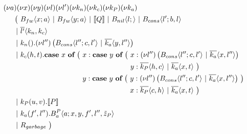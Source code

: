 
\begin{align*}
  &\anew{a}{\anew{x}{\anew{y}{\anew{l}{\anew{l'}{\anew{k_n}{\anew{k_c}{\anew{k_P}{\anew{k_a}{ \\
    &\hspace{0.5cm}
    \begin{aligned}[t]
      \big(\ &\ains{B_{fw}}{x}{a}
      \apar   \ains{B_{fw}}{y}{a}
      \apar   \encMJtoAP{Q}
      \apar   \ains{B_{nil}}{l}{}
      \apar   \ains{B_{cons}}{l'}{b, l}
      \\
      \apar  &\asnd{l'}{k_n,k_c}
      \\
      \apar  &\arcv{k_n}{} . \anew{l''}{\parens{\ains{B_{cons}}{l''}{c, l'} \apar \asnd{k_a}{y, l''}}}
      \\
      \apar  &\arcv{k_c}{h,t} .
        \begin{aligned}[t]
          \acse*{x}{\ 
            &\aalt{x}{
              \begin{aligned}[t]
                \acse*{y}{\ 
                  &\aalt{x}{\anew*{l''}{
                    \ains{B_{cons}}{l''}{c,l'} \apar \asnd{k_a}{x,l''}
                  }}\\
                  &\aalt{y}{
                    \asnd{k_P}{h,c} \apar \asnd{k_a}{x,t}
                  }\ 
                }
              \end{aligned}
            }\\
            &\aalt{y}{
              \begin{aligned}[t]
                \acse*{y}{\ 
                  &\aalt{y}{\anew*{l''}{
                    \ains{B_{cons}}{l''}{c,l'} \apar \asnd{k_a}{x,l''}
                  }}\\
                  &\aalt{x}{
                    \asnd{k_P}{c,h} \apar \asnd{k_a}{x,t}
                  }\ 
                }
              \end{aligned}
            }\ 
          }
        \end{aligned}
      \\
      \apar  &\arcv{k_P}{u,v} . \encMJtoAP{P}
      \\
      \apar  &\arcv{k_a}{f',l''} . \ains{B_a^P}{a}{x, y, f', l'',\tilde{z}_P}
      \\
      \apar  &R_{garbage}
      \ \big)
    \end{aligned}
  }}}}}}}}}
\end{align*}

